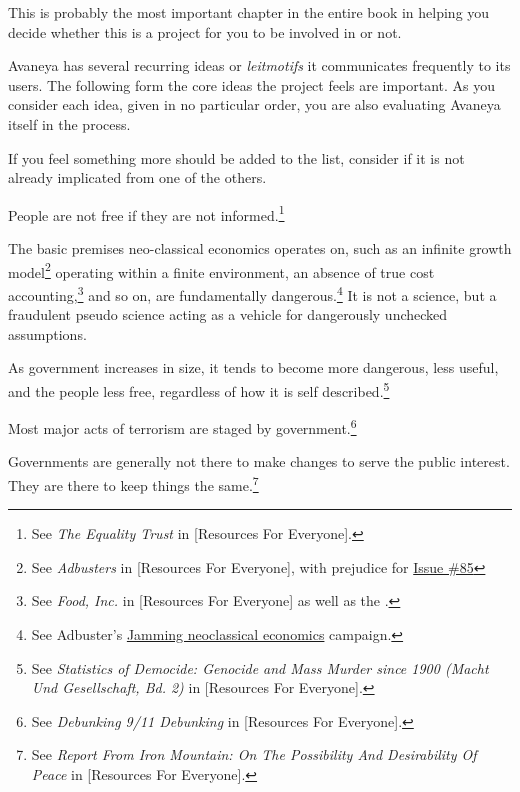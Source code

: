
This is probably the most important chapter in the entire book in helping you decide whether this is a project for you to be involved in or not. 

Avaneya has several recurring ideas or {\it leitmotifs} it communicates frequently to its users. The following form the core ideas the project feels are important. As you consider each idea, given in no particular order, you are also evaluating Avaneya itself in the process. 

If you feel something more should be added to the list, consider if it is not already implicated from one of the others.

\startitemize[n]
\item
People are not free if they are not informed.\footnote{See {\it The Equality Trust} in [Resources For Everyone].}

\item
The basic premises neo-classical economics operates on, such as an infinite growth model\footnote{See {\it Adbusters} in [Resources For Everyone], with prejudice for \href{http://www.adbusters.org/cultureshop/backissues/85}{Issue \#85}} operating within a finite environment, an absence of true cost accounting,\footnote{See {\it Food, Inc.} in [Resources For Everyone] as well as the .} and so on, are fundamentally dangerous.\footnote{See Adbuster's \href{http://anticap.wordpress.com/2010/10/25/jamming-neoclassical-economics/}{Jamming neoclassical economics} campaign.} It is not a science, but a fraudulent pseudo science acting as a vehicle for dangerously unchecked assumptions.

\item
As government increases in size, it tends to become more dangerous, less useful, and the people less free, regardless of how it is self described.\footnote{See {\it Statistics of Democide: Genocide and Mass Murder since 1900 (Macht Und Gesellschaft, Bd. 2)} in [Resources For Everyone].}

\item
Most major acts of terrorism are staged by government.\footnote{See {\it Debunking 9/11 Debunking} in [Resources For Everyone].}

\item
Governments are generally not there to make changes to serve the public interest. They are there to keep things the same.\footnote{See {\it Report From Iron Mountain: On The Possibility And Desirability Of Peace} in [Resources For Everyone].}

